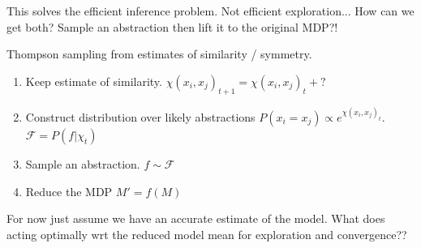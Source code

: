 This solves the efficient inference problem. Not efficient exploration... How can we get both?
Sample an abstraction then lift it to the original MDP?!


Thompson sampling from estimates of similarity / symmetry.
\begin{enumerate}
	\tightlist
	\item Keep estimate of similarity. $\chi(x_i, x_j)_{t+1} = \chi(x_i, x_j)_t + ?$
	\item Construct distribution over likely abstractions $P(x_i = x_j) \propto e^{\chi(x_i, x_j)_t}$. $\mathcal F = P(f|\chi_t)$
	\item Sample an abstraction. $f\sim \mathcal F$
	\item Reduce the MDP $M' = f(M)$
\end{enumerate}


For now just assume we have an accurate estimate of the model.
What does acting optimally wrt the reduced model mean for exploration and convergence??


